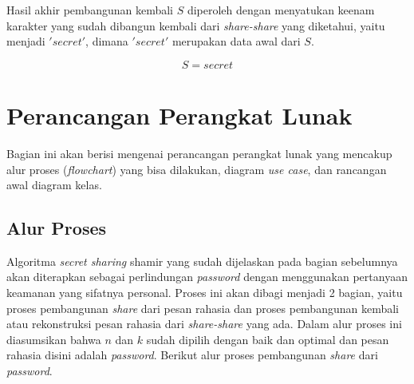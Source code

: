 Hasil akhir pembangunan kembali \begin{math}S\end{math} diperoleh dengan menyatukan keenam karakter yang sudah dibangun kembali dari \textit{share-share} yang diketahui, yaitu menjadi \begin{math}'secret'\end{math}, dimana \begin{math}'secret'\end{math} merupakan data awal dari \begin{math}S\end{math}.

\begin{displaymath}
	S = secret
\end{displaymath}

\section{Perancangan Perangkat Lunak}

Bagian ini akan berisi mengenai perancangan perangkat lunak yang mencakup alur proses (\textit{flowchart}) yang bisa dilakukan, diagram \textit{use case}, dan rancangan awal diagram kelas.

\subsection{Alur Proses}

Algoritma \textit{secret sharing} shamir yang sudah dijelaskan pada bagian sebelumnya akan diterapkan sebagai perlindungan \textit{password} dengan menggunakan pertanyaan keamanan yang sifatnya personal. Proses ini akan dibagi menjadi 2 bagian, yaitu proses pembangunan \textit{share} dari pesan rahasia dan proses pembangunan kembali atau rekonstruksi pesan rahasia dari \textit{share-share} yang ada. Dalam alur proses ini diasumsikan bahwa \begin{math}n\end{math} dan \begin{math}k\end{math} sudah dipilih dengan baik dan optimal dan pesan rahasia disini adalah \textit{password}. Berikut alur proses pembangunan \textit{share} dari \textit{password}.

